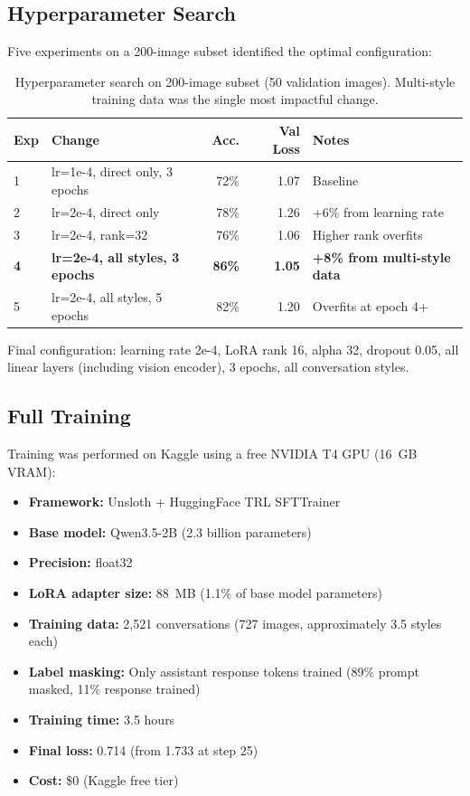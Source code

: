 \documentclass[12pt, a4paper]{article}
\begin{document}
\subsection{Hyperparameter Search}

Five experiments on a 200-image subset identified the optimal configuration:

\begin{table}[H]
\centering
\begin{tabular}{llrrl}
\toprule
\textbf{Exp} & \textbf{Change} & \textbf{Acc.} & \textbf{Val Loss} & \textbf{Notes} \\
\midrule
1 & lr=1e-4, direct only, 3 epochs & 72\% & 1.07 & Baseline \\
2 & lr=2e-4, direct only & 78\% & 1.26 & +6\% from learning rate \\
3 & lr=2e-4, rank=32 & 76\% & 1.06 & Higher rank overfits \\
\textbf{4} & \textbf{lr=2e-4, all styles, 3 epochs} & \textbf{86\%} & \textbf{1.05} & \textbf{+8\% from multi-style data} \\
5 & lr=2e-4, all styles, 5 epochs & 82\% & 1.20 & Overfits at epoch 4+ \\
\bottomrule
\end{tabular}
\caption{Hyperparameter search on 200-image subset (50 validation images). Multi-style training data was the single most impactful change.}
\end{table}

Final configuration: learning rate 2e-4, LoRA rank 16, alpha 32, dropout 0.05, all linear layers (including vision encoder), 3 epochs, all conversation styles.

\subsection{Full Training}

Training was performed on Kaggle using a free NVIDIA T4 GPU (16~GB VRAM):

\begin{itemize}
    \item \textbf{Framework:} Unsloth + HuggingFace TRL SFTTrainer
    \item \textbf{Base model:} Qwen3.5-2B (2.3 billion parameters)
    \item \textbf{Precision:} float32
    \item \textbf{LoRA adapter size:} 88~MB (1.1\% of base model parameters)
    \item \textbf{Training data:} 2,521 conversations (727 images, approximately 3.5 styles each)
    \item \textbf{Label masking:} Only assistant response tokens trained (89\% prompt masked, 11\% response trained)
    \item \textbf{Training time:} 3.5 hours
    \item \textbf{Final loss:} 0.714 (from 1.733 at step 25)
    \item \textbf{Cost:} \$0 (Kaggle free tier)
\end{itemize}
\end{document}
